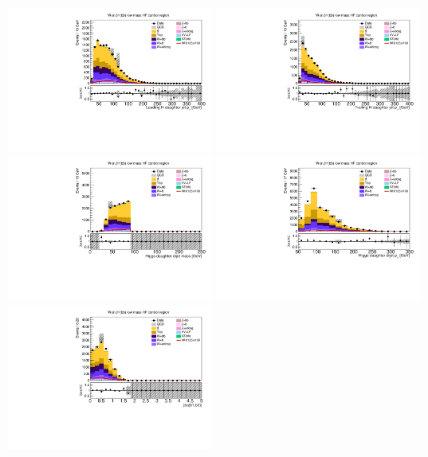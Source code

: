 \begin{figure}[tbp]
  \begin{center}
    \includegraphics[width=0.48\textwidth]{figures/wlnhbb2016/resolved/WenWHHeavyFlavorCRLowMass_Hbjet1Pt.pdf}
    \includegraphics[width=0.48\textwidth]{figures/wlnhbb2016/resolved/WenWHHeavyFlavorCRLowMass_Hbjet2Pt.pdf}
    \includegraphics[width=0.48\textwidth]{figures/wlnhbb2016/resolved/WenWHHeavyFlavorCRLowMass_mH.pdf}
    \includegraphics[width=0.48\textwidth]{figures/wlnhbb2016/resolved/WenWHHeavyFlavorCRLowMass_pTH.pdf}
    \includegraphics[width=0.48\textwidth]{figures/wlnhbb2016/resolved/WenWHHeavyFlavorCRLowMass_dEtab1b2.pdf}

\end{center}
\end{figure}
